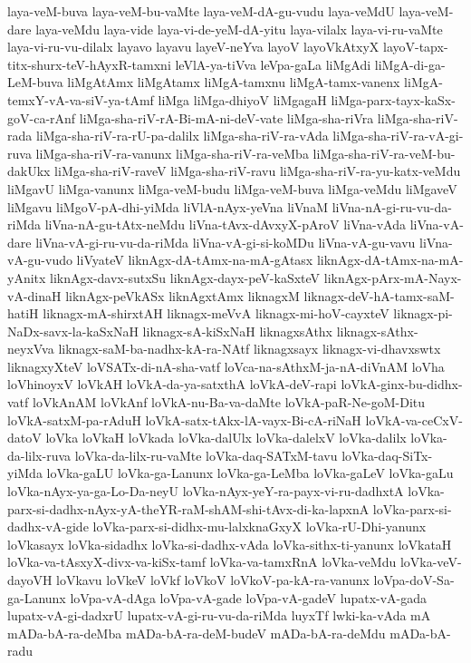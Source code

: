 {laya-veM-buva
laya-veM-bu-vaMte
laya-veM-dA-gu-vudu
laya-veMdU
laya-veM-dare
laya-veMdu
laya-vide
laya-vi-de-yeM-dA-yitu
laya-vilalx
laya-vi-ru-vaMte
laya-vi-ru-vu-dilalx
layavo
layavu
layeV-neYva
layoV
layoVkAtxyX
layoV-tapx-titx-shurx-teV-hAyxR-tamxni
leVlA-ya-tiVva
leVpa-gaLa
liMgAdi
liMgA-di-ga-LeM-buva
liMgAtAmx
liMgAtamx
liMgA-tamxnu
liMgA-tamx-vanenx
liMgA-temxY-vA-va-siV-ya-tAmf
liMga
liMga-dhiyoV
liMgagaH
liMga-parx-tayx-kaSx-goV-ca-rAnf
liMga-sha-riV-rA-Bi-mA-ni-deV-vate
liMga-sha-riVra
liMga-sha-riV-rada
liMga-sha-riV-ra-rU-pa-dalilx
liMga-sha-riV-ra-vAda
liMga-sha-riV-ra-vA-gi-ruva
liMga-sha-riV-ra-vanunx
liMga-sha-riV-ra-veMba
liMga-sha-riV-ra-veM-bu-dakUkx
liMga-sha-riV-raveV
liMga-sha-riV-ravu
liMga-sha-riV-ra-yu-katx-veMdu
liMgavU
liMga-vanunx
liMga-veM-budu
liMga-veM-buva
liMga-veMdu
liMgaveV
liMgavu
liMgoV-pA-dhi-yiMda
liVlA-nAyx-yeVna
liVnaM
liVna-nA-gi-ru-vu-da-riMda
liVna-nA-gu-tAtx-neMdu
liVna-tAvx-dAvxyX-pAroV
liVna-vAda
liVna-vA-dare
liVna-vA-gi-ru-vu-da-riMda
liVna-vA-gi-si-koMDu
liVna-vA-gu-vavu
liVna-vA-gu-vudo
liVyateV
liknAgx-dA-tAmx-na-mA-gAtasx
liknAgx-dA-tAmx-na-mA-yAnitx
liknAgx-davx-sutxSu
liknAgx-dayx-peV-kaSxteV
liknAgx-pArx-mA-Nayx-vA-dinaH
liknAgx-peVkASx
liknAgxtAmx
liknagxM
liknagx-deV-hA-tamx-saM-hatiH
liknagx-mA-shirxtAH
liknagx-meVvA
liknagx-mi-hoV-cayxteV
liknagx-pi-NaDx-savx-la-kaSxNaH
liknagx-sA-kiSxNaH
liknagxsAthx
liknagx-sAthx-neyxVva
liknagx-saM-ba-nadhx-kA-ra-NAtf
liknagxsayx
liknagx-vi-dhavxswtx
liknagxyXteV
loVSATx-di-nA-sha-vatf
loVca-na-sAthxM-ja-nA-diVnAM
loVha
loVhinoyxV
loVkAH
loVkA-da-ya-satxthA
loVkA-deV-rapi
loVkA-ginx-bu-didhx-vatf
loVkAnAM
loVkAnf
loVkA-nu-Ba-va-daMte
loVkA-paR-Ne-goM-Ditu
loVkA-satxM-pa-rAduH
loVkA-satx-tAkx-lA-vayx-Bi-cA-riNaH
loVkA-va-ceCxV-datoV
loVka
loVkaH
loVkada
loVka-dalUlx
loVka-dalelxV
loVka-dalilx
loVka-da-lilx-ruva
loVka-da-lilx-ru-vaMte
loVka-daq-SATxM-tavu
loVka-daq-SiTx-yiMda
loVka-gaLU
loVka-ga-Lanunx
loVka-ga-LeMba
loVka-gaLeV
loVka-gaLu
loVka-nAyx-ya-ga-Lo-Da-neyU
loVka-nAyx-yeY-ra-payx-vi-ru-dadhxtA
loVka-parx-si-dadhx-nAyx-yA-theYR-raM-shAM-shi-tAvx-di-ka-lapxnA
loVka-parx-si-dadhx-vA-gide
loVka-parx-si-didhx-mu-lalxknaGxyX
loVka-rU-Dhi-yanunx
loVkasayx
loVka-sidadhx
loVka-si-dadhx-vAda
loVka-sithx-ti-yanunx
loVkataH
loVka-va-tAsxyX-divx-va-kiSx-tamf
loVka-va-tamxRnA
loVka-veMdu
loVka-veV-dayoVH
loVkavu
loVkeV
loVkf
loVkoV
loVkoV-pa-kA-ra-vanunx
loVpa-doV-Sa-ga-Lanunx
loVpa-vA-dAga
loVpa-vA-gade
loVpa-vA-gadeV
lupatx-vA-gada
lupatx-vA-gi-dadxrU
lupatx-vA-gi-ru-vu-da-riMda
luyxTf
lwki-ka-vAda
mA
mADa-bA-ra-deMba
mADa-bA-ra-deM-budeV
mADa-bA-ra-deMdu
mADa-bA-radu
}
